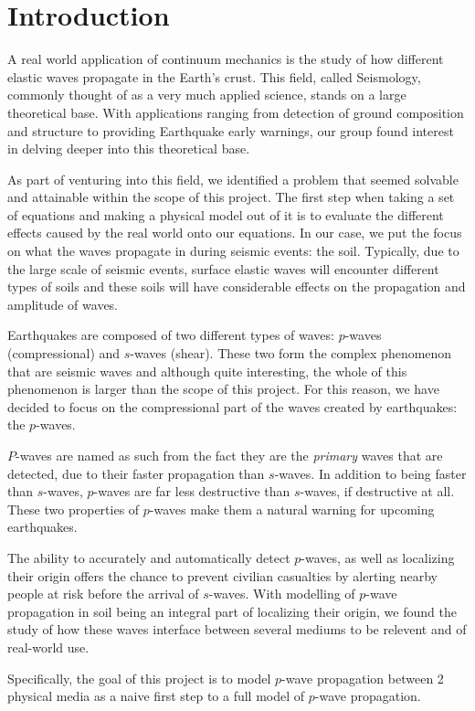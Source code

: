 \chapter{Introduction}

A real world application of continuum mechanics is the study of how different elastic waves propagate in the Earth's crust. This field, called Seismology, commonly thought of as a very much applied science, stands on a large theoretical base. With applications ranging from detection of ground composition and structure\cite{https://doi.org/10.1029/95JB00259} to providing Earthquake early warnings\cite{government_of_canada_2019}, our group found interest in delving deeper into this theoretical base.

As part of venturing into this field, we identified a problem that seemed solvable and attainable within the scope of this project. The first step when taking a set of equations and making a physical model out of it is to evaluate the different effects caused by the real world onto our equations. In our case, we put the focus on what the waves propagate in during seismic events: the soil. Typically, due to the large scale of seismic events, surface elastic waves will encounter different types of soils and these soils will have considerable effects on the propagation and amplitude of waves.

Earthquakes are composed of two different types of waves: $p$-waves (compressional) and $s$-waves (shear). These two form the complex phenomenon that are seismic waves and although quite interesting, the whole of this phenomenon is larger than the scope of this project. For this reason, we have decided to focus on the compressional part of the waves created by earthquakes: the $p$-waves.

$P$-waves are named as such from the fact they are the \textit{primary} waves that are detected, due to their faster propagation than $s$-waves. In addition to being faster than $s$-waves, $p$-waves are far less destructive than $s$-waves, if destructive at all. These two properties of $p$-waves make them a natural warning for upcoming earthquakes.

The ability to accurately and automatically detect $p$-waves, as well as localizing their origin offers the chance to prevent civilian casualties by alerting nearby people at risk before the arrival of $s$-waves. With modelling of $p$-wave propagation in soil being an integral part of localizing their origin, we found the study of how these waves interface between several mediums to be relevent and of real-world use.

Specifically, the goal of this project is to model $p$-wave propagation between 2 physical media as a naive first step to a full model of $p$-wave propagation.